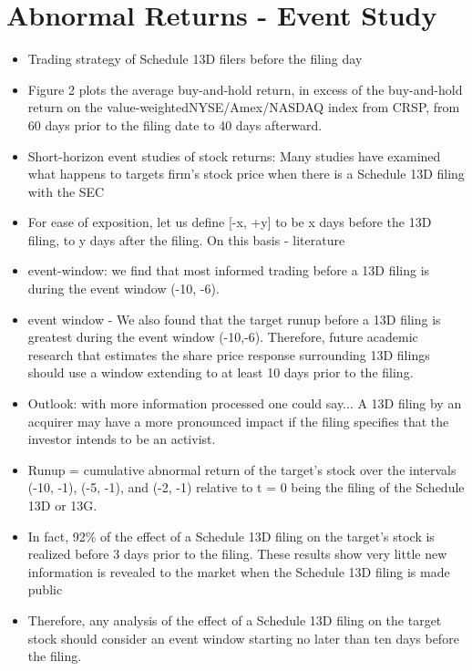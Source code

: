\documentclass[12pt]{article}
\begin{document}
\section{Abnormal Returns - Event Study} 
    \begin{itemize}
        \item Trading strategy of Schedule 13D filers before the filing day \citep{Collin-Dufresne2015}
        \item Figure 2 plots the average buy-and-hold return, in excess of the buy-and-hold return on the value-weightedNYSE/Amex/NASDAQ index from CRSP, from 60 days prior to the filing date to 40 days afterward.\citep{Collin-Dufresne2015}
        \item Short-horizon event studies of stock returns: Many studies have examined what happens to targets firm’s stock price when there is a Schedule 13D filing with the SEC \citep{CoffeeJr.2014}
        \item For ease of exposition, let us define [-x, +y] to be x days before the 13D filing, to y days after the filing. On this basis - literature \citep{CoffeeJr.2014}
        \item event-window: we find that most informed trading before a 13D filing is during the event window (-10, -6).\citep{Brigida2012}
        \item event window - We also found that the target runup before a 13D filing is greatest during the event window (-10,-6). Therefore, future academic research that estimates the share price response surrounding 13D filings should use a window extending to at least 10 days prior to the filing. \citep{Brigida2012}
        \item Outlook: with more information processed one could say... A 13D filing by an acquirer may have a more pronounced impact if the filing specifies that the investor intends to be an activist. \citep{Brigida2012}
        \item Runup = cumulative abnormal return of the target’s stock over the intervals (-10, -1), (-5, -1), and (-2, -1) relative to t = 0 being the filing of the Schedule 13D or 13G. \citep{Brigida2012}
        \item In fact, 92\% of the effect of a Schedule 13D filing on the target’s stock is realized before 3 days prior to the filing. These results show very little new information is revealed to the market when the Schedule 13D filing is made public \citep{Brigida2012}
        \item Therefore, any analysis of the effect of a Schedule 13D filing on the target stock should consider an event window starting no later than ten days before the filing. \citep{Brigida2012}

\end{itemize}
\end{document}
